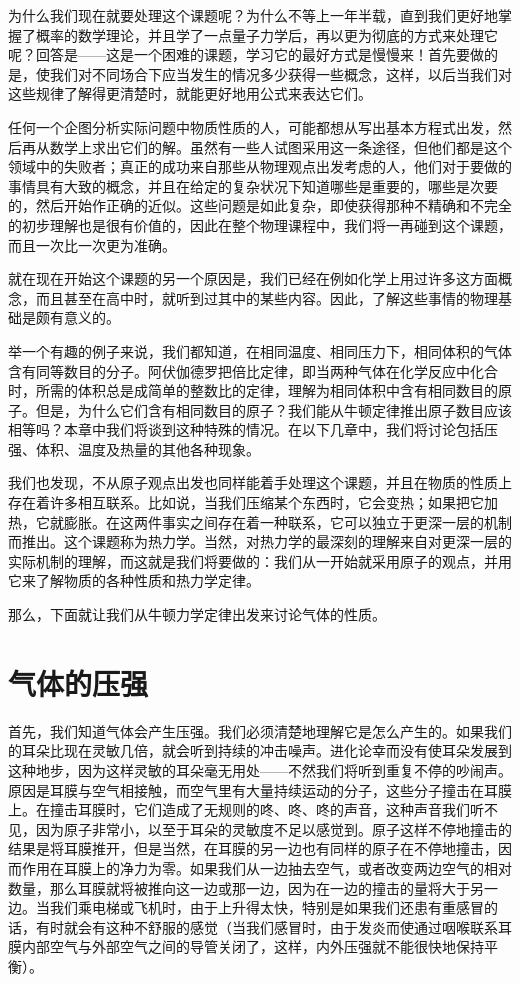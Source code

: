 为什么我们现在就要处理这个课题呢？为什么不等上一年半载，直到我们更好地掌握了概率的数学理论，并且学了一点量子力学后，再以更为彻底的方式来处理它呢？回答是——这是一个困难的课题，学习它的最好方式是慢慢来！首先要做的是，使我们对不同场合下应当发生的情况多少获得一些概念，这样，以后当我们对这些规律了解得更清楚时，就能更好地用公式来表达它们。

任何一个企图分析实际问题中物质性质的人，可能都想从写出基本方程式出发，然后再从数学上求出它们的解。虽然有一些人试图采用这一条途径，但他们都是这个领域中的失败者；真正的成功来自那些从物理观点出发考虑的人，他们对于要做的事情具有大致的概念，并且在给定的复杂状况下知道哪些是重要的，哪些是次要的，然后开始作正确的近似。这些问题是如此复杂，即使获得那种不精确和不完全的初步理解也是很有价值的，因此在整个物理课程中，我们将一再碰到这个课题，而且一次比一次更为准确。

就在现在开始这个课题的另一个原因是，我们已经在例如化学上用过许多这方面概念，而且甚至在高中时，就听到过其中的某些内容。因此，了解这些事情的物理基础是颇有意义的。

举一个有趣的例子来说，我们都知道，在相同温度、相同压力下，相同体积的气体含有同等数目的分子。阿伏伽德罗把倍比定律，即当两种气体在化学反应中化合时，所需的体积总是成简单的整数比的定律，理解为相同体积中含有相同数目的原子。但是，为什么它们含有相同数目的原子？我们能从牛顿定律推出原子数目应该相等吗？本章中我们将谈到这种特殊的情况。在以下几章中，我们将讨论包括压强、体积、温度及热量的其他各种现象。

我们也发现，不从原子观点出发也同样能着手处理这个课题，并且在物质的性质上存在着许多相互联系。比如说，当我们压缩某个东西时，它会变热；如果把它加热，它就膨胀。在这两件事实之间存在着一种联系，它可以独立于更深一层的机制而推出。这个课题称为热力学。当然，对热力学的最深刻的理解来自对更深一层的实际机制的理解，而这就是我们将要做的：我们从一开始就采用原子的观点，并用它来了解物质的各种性质和热力学定律。

那么，下面就让我们从牛顿力学定律出发来讨论气体的性质。

\section{气体的压强}

首先，我们知道气体会产生压强。我们必须清楚地理解它是怎么产生的。如果我们的耳朵比现在灵敏几倍，就会听到持续的冲击噪声。进化论幸而没有使耳朵发展到这种地步，因为这样灵敏的耳朵毫无用处——不然我们将听到重复不停的吵闹声。原因是耳膜与空气相接触，而空气里有大量持续运动的分子，这些分子撞击在耳膜上。在撞击耳膜时，它们造成了无规则的咚、咚、咚的声音，这种声音我们听不见，因为原子非常小，以至于耳朵的灵敏度不足以感觉到。原子这样不停地撞击的结果是将耳膜推开，但是当然，在耳膜的另一边也有同样的原子在不停地撞击，因而作用在耳膜上的净力为零。如果我们从一边抽去空气，或者改变两边空气的相对数量，那么耳膜就将被推向这一边或那一边，因为在一边的撞击的量将大于另一边。当我们乘电梯或飞机时，由于上升得太快，特别是如果我们还患有重感冒的话，有时就会有这种不舒服的感觉（当我们感冒时，由于发炎而使通过咽喉联系耳膜内部空气与外部空气之间的导管关闭了，这样，内外压强就不能很快地保持平衡）。

